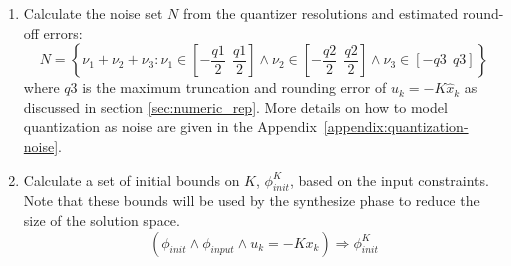 \documentclass[runningheads,a4paper]{llncs}
\begin{document}
\begin{enumerate}
\begin{enumerate}
\item Calculate the noise set $N$ from the quantizer resolutions and estimated round-off errors: %
$$N=\left \{ \nu_1+\nu_2+ \nu_3 : \nu_1 \in \left[-\frac{q1}{2}\ \ \frac{q1}{2}\right] 
\wedge \nu_2 \in \left[-\frac{q2}{2}\ \ \frac{q2}{2}\right]  \wedge \nu_3 \in \left[-q3\ \ q3\right]  \right \}\nonumber$$
where $q3$ is the maximum truncation and rounding error of $u_k=-K\hat{x}_k$ as discussed in section \ref{sec:numeric_rep}.
More details on how to model quantization as noise are given in the 
Appendix~\ref{appendix:quantization-noise}.
\item Calculate a set of initial bounds on $K$, $\phi_{init}^{K}$, based on the input constraints. Note that these bounds will be used by the {\sc synthesize} phase to reduce the size of the solution space.
$$(\phi_{init} \wedge \phi_{input} \wedge u_k=-K x_k) \Rightarrow \phi_{init}^{K}$$


\end{enumerate}
\end{enumerate}
\end{document}
